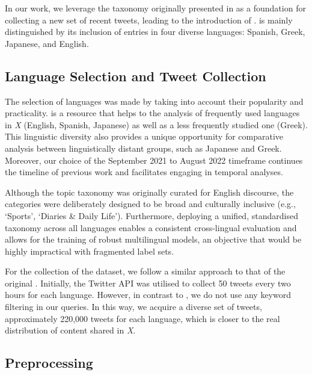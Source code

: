 In our work, we leverage the taxonomy originally presented in {\TweetTopic} as a foundation for collecting a new set of recent tweets, leading to the introduction of {\XTOPIC}. {\XTOPIC} is mainly distinguished by its inclusion of entries in four diverse languages: Spanish, Greek, Japanese, and English. 

\subsection{Language Selection and Tweet Collection}

The selection of languages was made by taking into account their popularity and practicality. {\XTOPIC} is a resource that helps to the analysis of frequently used languages in \textit{X} (English, Spanish, Japanese) as well as a less frequently studied one (Greek). This linguistic diversity also provides a unique opportunity for comparative analysis between linguistically distant groups, such as Japanese and Greek. Moreover, our choice of the September 2021 to August 2022 timeframe continues the timeline of previous work and facilitates engaging in temporal analyses.

Although the topic taxonomy was originally curated for English discourse, the categories were deliberately designed to be broad and culturally inclusive (e.g., `Sports', `Diaries \& Daily Life'). Furthermore, deploying a unified, standardised taxonomy across all languages enables a consistent cross-lingual evaluation and allows for the training of robust multilingual models, an objective that would be highly impractical with fragmented label sets.

For the collection of the dataset, we follow a similar approach to that of the original {\TweetTopic}. Initially, the Twitter API was utilised to collect 50 tweets every two hours for each language. However, in contrast to {\TweetTopic}, we do not use any keyword filtering in our queries. In this way, we acquire a diverse set of tweets, approximately 220,000 tweets for each language, which is closer to the real distribution of content shared in \textit{X}. 



\subsection{Preprocessing}
\label{sec:preprocessing}

